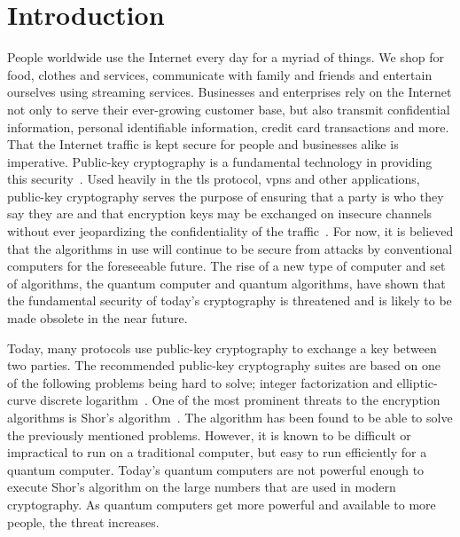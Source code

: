 \chapter{Introduction}
\label{chapter:introduction}


People worldwide use the Internet every day for a myriad of things. We shop for food, clothes and services, communicate with family and friends and entertain ourselves using streaming services. Businesses and enterprises rely on the Internet not only to serve their ever-growing customer base, but also transmit confidential information, personal identifiable information, credit card transactions and more. That the Internet traffic is kept secure for people and businesses alike is imperative. Public-key cryptography is a fundamental technology in providing this security~\cite{rfc8446}. Used heavily in the \gls{tls} protocol, \glspl{vpn} and other applications, public-key cryptography serves the purpose of ensuring that a party is who they say they are and that encryption keys may be exchanged on insecure channels without ever jeopardizing the confidentiality of the traffic~\cite{rfc8446}. For now, it is believed that the algorithms in use will continue to be secure from attacks by conventional computers for the foreseeable future. The rise of a new type of computer and set of algorithms, the quantum computer and quantum algorithms, have shown that the fundamental security of today's cryptography is threatened and is likely to be made obsolete in the near future.

Today, many protocols use public-key cryptography to exchange a key between two parties. The recommended public-key cryptography suites are based on one of the following problems being hard to solve; integer factorization and elliptic-curve discrete logarithm~\cite{nsa2015, nist2019}. One of the most prominent threats to the encryption algorithms is Shor's algorithm~\cite{shor1997}. The algorithm has been found to be able to solve the previously mentioned problems. However, it is known to be difficult or impractical to run on a traditional computer, but easy to run efficiently for a quantum computer. Today's quantum computers are not powerful enough to execute Shor's algorithm on the large numbers that are used in modern cryptography. As quantum computers get more powerful and available to more people, the threat increases.

